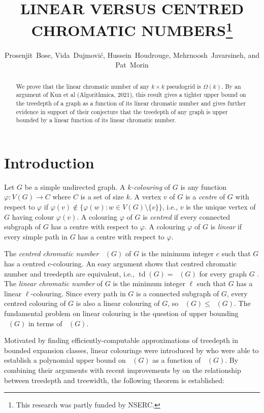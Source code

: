 \documentclass{patmorin}
\title{\MakeUppercase{Linear versus centred chromatic numbers}\thanks{This research was partly funded by NSERC.}}
\author{Prosenjit~Bose, Vida~Dujmović, Hussein~Houdrouge, Mehrnoosh~Javarsineh, and Pat~Morin}
\date{}
\newcommand{\defin}[1]{\emph{\color{brightmaroon}#1}}
\DeclareMathOperator{\td}{td}
\DeclareMathOperator{\chicen}{\chi_{\mathrm{cen}}}
\DeclareMathOperator{\chilin}{\chi_{\mathrm{lin}}}
\begin{document}
\maketitle
\renewcommand{\E}{\mathbb{E}}
\renewcommand{\Pr}{\mathbb{P}}

\begin{abstract}
  We prove that the linear chromatic number of any $k\times k$ pseudogrid is $\Omega(k)$.  By an argument of Kun et al (Algorithmica, 2021), this result gives a tighter upper bound on the treedepth of a graph as a function of its linear chromatic number and gives further evidence in support of their conjecture that the treedepth of any graph is upper bounded by a linear function of its linear chromatic number.
\end{abstract}

\section{Introduction}

Let $G$ be a simple undirected graph.  A \defin{$k$-colouring} of $G$ is any function $\varphi:V(G)\to C$ where $C$ is a set of size $k$.  A vertex $v$ of $G$ is a \defin{centre} of $G$ with respect to $\varphi$ if $\varphi(v)\not\in\{\varphi(w):w\in V(G)\setminus\{v\}\}$, i.e., $v$ is the unique vertex of $G$ having colour $\varphi(v)$.  A colouring $\varphi$ of $G$ is \defin{centred} if every connected subgraph of $G$ has a centre with respect to $\varphi$. A colouring $\varphi$ of $G$ is \defin{linear} if every simple path in $G$ has a centre with respect to $\varphi$.

The \defin{centred chromatic number} $\chicen(G)$ of $G$ is the minimum integer $c$ such that $G$ has a centred $c$-colouring.  An easy argument shows that centred chromatic number and treedepth are equivalent, i.e., $\td(G)=\chicen(G)$ for every graph $G$ \cite{nesetril.ossona:sparsity}. The \defin{linear chromatic number} of $G$ is the minimum integer $\ell$ such that $G$ has a linear $\ell$-colouring.  Since every path in $G$ is a connected subgraph of $G$, every centred colouring of $G$ is also a linear colouring of $G$, so $\chilin(G)\le\chicen(G)$.  The fundamental problem on linear colouring is the question of upper bounding $\chicen(G)$ in terms of $\chilin(G)$.

Motivated by finding efficiently-computable approximations of treedepth in bounded expansion classes, linear colourings were introduced by \citet{kun.obrien.ea:polynomial} who were able to establish a polynomial upper bound on $\chicen(G)$ as a function of $\chilin(G)$.  By combining their arguments with recent improvements by \citet{czerwinski.nadara.ea:improved} on the relationship between treedepth and treewidth, the following theorem is established:
\end{document}
